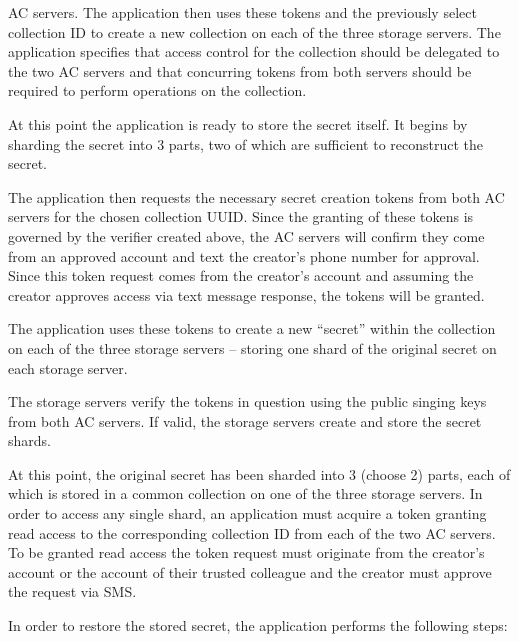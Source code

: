 \begin{packed_enum}
{    AC servers}. The application then uses these tokens and the
  previously select collection ID to create a new collection on each
  of the three storage servers. The application specifies that access
  control for the collection should be delegated to the two AC servers
  and that concurring tokens from both servers should be required to
  perform operations on the collection.
\item At this point the application is ready to store the secret
  itself. It begins by sharding the secret into 3 parts, two of which
  are sufficient to reconstruct the secret.
\item The application then requests the necessary secret creation
  tokens from both AC servers for the chosen collection UUID. Since
  the granting of these tokens is governed by the verifier created
  above, the AC servers will confirm they come from an approved
  account and text the creator's phone number for approval. Since this
  token request comes from the creator's account and assuming the
  creator approves access via text message response, the tokens will
  be granted.
\item The application uses these tokens to create a new ``secret''
  within the collection on each of the three storage servers --
  storing one shard of the original secret on each storage server.
\item The storage servers verify the tokens in question using the
  public singing keys from both AC servers. If valid, the storage
  servers create and store the secret shards.
\end{packed_enum}

At this point, the original secret has been sharded into 3 (choose 2)
parts, each of which is stored in a common collection on one of the
three storage servers. In order to access any single shard, an
application must acquire a token granting read access to the
corresponding collection ID from each of the two AC servers. To be
granted read access the token request must originate from the
creator's account or the account of their trusted colleague and the
creator must approve the request via SMS.

In order to restore the stored secret, the application performs the
following steps:

